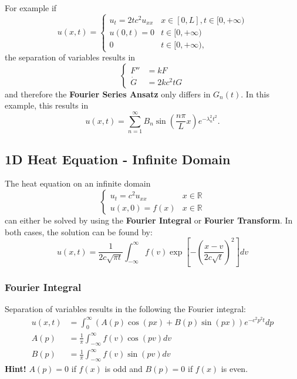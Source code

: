 For example if
\begin{equation*}
    u(x,t)=
    \begin{cases}u_t=2tc^2u_{xx} & x\in[0,L],t\in[0,+\infty) \\%
             u(0,t)=0        & t\in[0,+\infty)           \\%
             0               & t\in[0,+\infty),          %
    \end{cases}
\end{equation*}
the separation of variables results in
\begin{equation*}
    \begin{cases}
        F''     & =kF      \\
        \dot{G} & =2kc^2tG
    \end{cases}
\end{equation*}
and therefore the \textbf{Fourier Series Ansatz} only differs in $G_n(t)$.
In this example, this results in
\begin{equation*}
    u(x,t) =\sum_{n=1}^\infty B_n\sin(\frac{n\pi}Lx)e^{-\lambda_n^2t^2}.
\end{equation*}

\subsection{1D Heat Equation - Infinite Domain}\label{ssec:1d_heat_inf}
The heat equation on an infinite domain
\begin{equation*}
    \begin{cases}
        u_t=c^2u_{xx} & x\in \mathbb{R} \\
        u(x,0)=f(x)   & x\in \mathbb{R}
    \end{cases}
\end{equation*}
can either be solved by using the \textbf{Fourier Integral} or \textbf{Fourier Transform}.
In both cases, the solution can be found by:
\begin{equation*}
    u(x,t)=\frac{1}{2c\sqrt{\pi t}}\int_{-\infty}^{\infty}f(v)\exp\left[-{\left(\frac{x-v}{2c\sqrt{t}}\right)}^{2}\right]dv
\end{equation*}


\subsubsection{Fourier Integral}
Separation of variables results in the following the Fourier integral:
\begin{align*}
    u(x,t) & =\int_0^\infty(A(p)\cos(px)+B(p)\sin(px))e^{-c^2p^2t}dp \\
    A(p)   & =\frac1\pi\int_{-\infty}^\infty f(v)\cos(pv)dv          \\
    B(p)   & =\frac1\pi\int_{-\infty}^\infty f(v)\sin(pv)dv
\end{align*}
\textbf{Hint!} $A(p)=0$ if $f(x)$ is odd and $B(p)=0$ if $f(x)$ is even.


